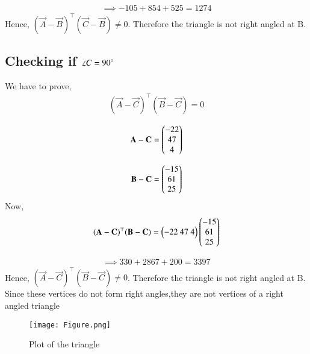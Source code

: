 \documentclass[journal,12pt,twocolumn]{IEEEtran}
\begin{document}
\begin{align}
\implies -105+854+525 = 1274
\end{align}
 Hence,  $(\vec{A}-\vec{B})^\top(\vec{C}-\vec{B})\neq 0$. Therefore the triangle is not right angled at B.

\subsection{Checking if $\angle C ={90}\degree$}
We have to prove,
\begin{align}
   (\vec{A}-\vec{C})^\top(\vec{B}-\vec{C})=0
\end{align}

\begin{align}
    \mathbf A - \mathbf C = \begin{pmatrix}-22\\47\\4\end{pmatrix}
\end{align}

\begin{align}
     \mathbf B - \mathbf C = \begin{pmatrix}-15\\61\\25\end{pmatrix}
\end{align}
Now,
\begin{align}
     (\vec{A}-\vec{C})^\top(\vec{B}-\vec{C})=\myvec{-22\ 47 \ 4}\myvec{-15\\61\\25}
\end{align}

\begin{align}
\implies 330+2867+200 = 3397
\end{align}
 Hence,  $(\vec{A}-\vec{C})^\top(\vec{B}-\vec{C})\neq 0$. Therefore the triangle is not right angled at B.
\\
Since these vertices do not form right angles,they are not vertices of a right angled triangle
\begin{figure}[!h]
         \centering
         \texttt{[image: Figure.png]}
         \caption{Plot of the triangle}
         \label{Figure}
\end{figure}
\end{document}
